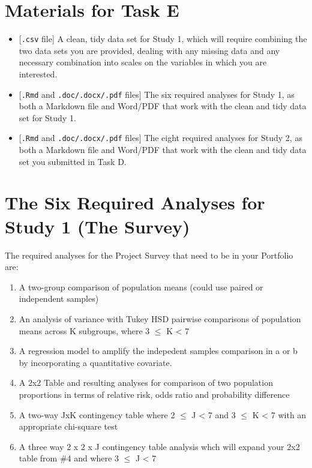 \documentclass[]{book}
\providecommand{\tightlist}{%
  \setlength{\itemsep}{0pt}\setlength{\parskip}{0pt}}
\theoremstyle{definition}
\theoremstyle{definition}
\theoremstyle{definition}
\theoremstyle{remark}
\begin{document}
\hypertarget{materials-for-task-e}{%
\section{Materials for Task E}\label{materials-for-task-e}}

\begin{itemize}
\tightlist
\item
  {[}\texttt{.csv} file{]} A clean, tidy data set for Study 1, which
  will require combining the two data sets you are provided, dealing
  with any missing data and any necessary combination into scales on the
  variables in which you are interested.
\item
  {[}\texttt{.Rmd} and \texttt{.doc/.docx/.pdf} files{]} The six
  required analyses for Study 1, as both a Markdown file and Word/PDF
  that work with the clean and tidy data set for Study 1.
\item
  {[}\texttt{.Rmd} and \texttt{.doc/.docx/.pdf} files{]} The eight
  required analyses for Study 2, as both a Markdown file and Word/PDF
  that work with the clean and tidy data set you submitted in Task D.
\end{itemize}

\hypertarget{the-six-required-analyses-for-study-1-the-survey}{%
\section{The Six Required Analyses for Study 1 (The
Survey)}\label{the-six-required-analyses-for-study-1-the-survey}}

The required analyses for the Project Survey that need to be in your
Portfolio are:

\begin{enumerate}
\def\labelenumi{\arabic{enumi}.}
\tightlist
\item
  A two-group comparison of population means (could use paired or
  independent samples)
\item
  An analysis of variance with Tukey HSD pairwise comparisons of
  population means across K subgroups, where 3 \(\leq\) K \textless{} 7
\item
  A regression model to amplify the indepedent samples comparison in a
  or b by incorporating a quantitative covariate.
\item
  A 2x2 Table and resulting analyses for comparison of two population
  proportions in terms of relative risk, odds ratio and probability
  difference
\item
  A two-way JxK contingency table where 2 \(\leq\) J \textless{} 7 and 3
  \(\leq\) K \textless{} 7 with an appropriate chi-square test
\item
  A three way 2 x 2 x J contingency table analysis whch will expand your
  2x2 table from \#4 and where 3 \(\leq\) J \textless{} 7
\end{enumerate}
\end{document}
